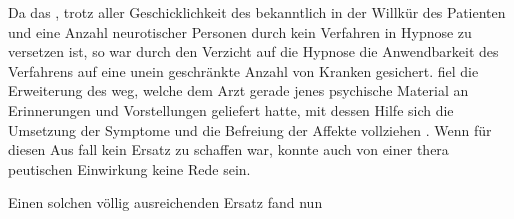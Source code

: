 \documentclass[twoside=true,titlepage=false,open=any, parskip=never, fontsize=10pt, headings=small, chapterprefix=false, appendixprefix=false]{scrbook}
\begin{document}
        \pstart
        Da das , trotz aller Geschicklichkeit des
 bekanntlich in der Willkür des Patienten  und eine
 Anzahl neurotischer Personen durch kein Verfahren in
 Hypnose zu versetzen
               ist, so war durch den Verzicht auf die
 Hypnose die Anwendbarkeit des Verfahrens
               auf eine unein
geschränkte Anzahl von Kranken gesichert.  fiel die
 Erweiterung des  weg, welche dem Arzt gerade jenes
 psychische Material an Erinnerungen und
               Vorstellungen geliefert
 hatte, mit dessen Hilfe sich die Umsetzung der Symptome
               und
 die Befreiung der Affekte vollziehen . Wenn für diesen Aus
fall kein Ersatz zu schaffen war, konnte
               auch von einer thera
peutischen Einwirkung keine Rede sein.
        \pend
    

        \pstart
        Einen solchen völlig ausreichenden Ersatz fand nun 
\end{document}
